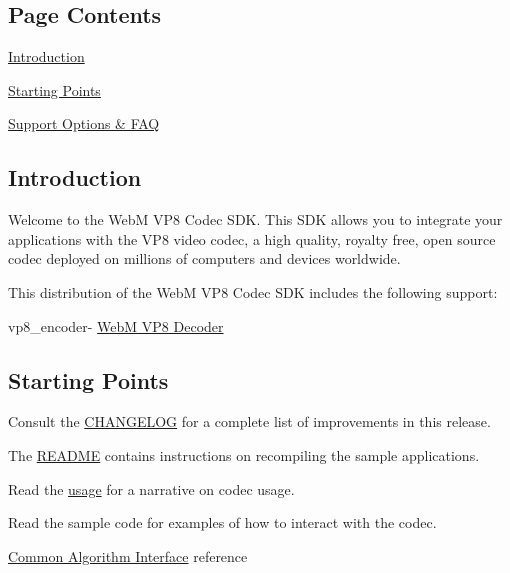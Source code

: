 \hypertarget{index_main_contents}{}\subsection{\-Page Contents}\label{index_main_contents}

\begin{DoxyItemize}
\item \hyperlink{index_main_intro}{\-Introduction}
\item \hyperlink{index_main_startpoints}{\-Starting \-Points}
\item \hyperlink{index_main_support}{\-Support \-Options \& \-F\-A\-Q}
\end{DoxyItemize}\hypertarget{index_main_intro}{}\subsection{\-Introduction}\label{index_main_intro}
\-Welcome to the \-Web\-M \-V\-P8 \-Codec \-S\-D\-K. \-This \-S\-D\-K allows you to integrate your applications with the \-V\-P8 video codec, a high quality, royalty free, open source codec deployed on millions of computers and devices worldwide.

\-This distribution of the \-Web\-M \-V\-P8 \-Codec \-S\-D\-K includes the following support\-:


\begin{DoxyItemize}
\item vp8\-\_\-encoder-\/ \hyperlink{group__vp8__decoder}{\-Web\-M \-V\-P8 \-Decoder}
\end{DoxyItemize}\hypertarget{index_main_startpoints}{}\subsection{\-Starting Points}\label{index_main_startpoints}

\begin{DoxyItemize}
\item \-Consult the \hyperlink{changelog}{\-C\-H\-A\-N\-G\-E\-L\-O\-G} for a complete list of improvements in this release.
\item \-The \hyperlink{readme}{\-R\-E\-A\-D\-M\-E} contains instructions on recompiling the sample applications.
\item \-Read the \hyperlink{usage}{usage} for a narrative on codec usage.
\item \-Read the sample code for examples of how to interact with the codec.
\item \hyperlink{group__codec}{\-Common \-Algorithm \-Interface} reference
\end{DoxyItemize}

